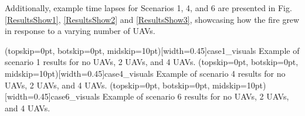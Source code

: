 \documentclass{ieeeaccess}
\begin{document}

Additionally, example time lapses for Scenarios 1, 4, and 6 are presented in Fig. \ref{ResultsShow1}, \ref{ResultsShow2} and \ref{ResultsShow3}, showcasing how the fire grew in response to a varying number of UAVs.


\Figure[t!](topskip=0pt, botskip=0pt, midskip=10pt)[width=0.45\textwidth]{case1_visuals}
{Example of scenario 1 results for no UAVs, 2 UAVs, and 4 UAVs.\label{ResultsShow1}}
\Figure[t!](topskip=0pt, botskip=0pt, midskip=10pt)[width=0.45\textwidth]{case4_visuals}
{Example of scenario 4 results for no UAVs, 2 UAVs, and 4 UAVs.\label{ResultsShow2}}
\Figure[t!](topskip=0pt, botskip=0pt, midskip=10pt)[width=0.45\textwidth]{case6_visuals}
{Example of scenario 6 results for no UAVs, 2 UAVs, and 4 UAVs.\label{ResultsShow13}}
\end{document}
